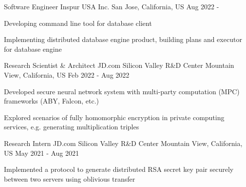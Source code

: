 


\begin{cventries}


\cventry
{Software Engineer} %
{Inspur USA Inc.} %
{San Jose, California, US} %
{Aug 2022 - } %
{ %
	\begin{cvitems}
		\item {Developing command line tool for database client}
		\item {Implementing distributed database engine product, building plans and executor for database engine}
	\end{cvitems}
}


\cventry
{Research Scientist \& Architect} %
{JD.com Silicon Valley R\&D Center} %
{Mountain View, California, US} %
{Feb 2022 - Aug 2022} %
{ %
\begin{cvitems}
\item {Developed secure neural network system with multi-party computation (MPC) frameworks (ABY, Falcon, etc.)}
\item {Explored scenarios of fully homomorphic encryption in private computing services, e.g. generating multiplication triples}
\end{cvitems}
}


\cventry
{Research Intern} %
{JD.com Silicon Valley R\&D Center} %
{Mountain View, California, US} %
{May 2021 - Aug 2021} %
{ %
\begin{cvitems}
\item {Implemented a protocol to generate distributed RSA secret key pair securely between two servers using oblivious transfer}
\end{cvitems}
}


\end{cventries}